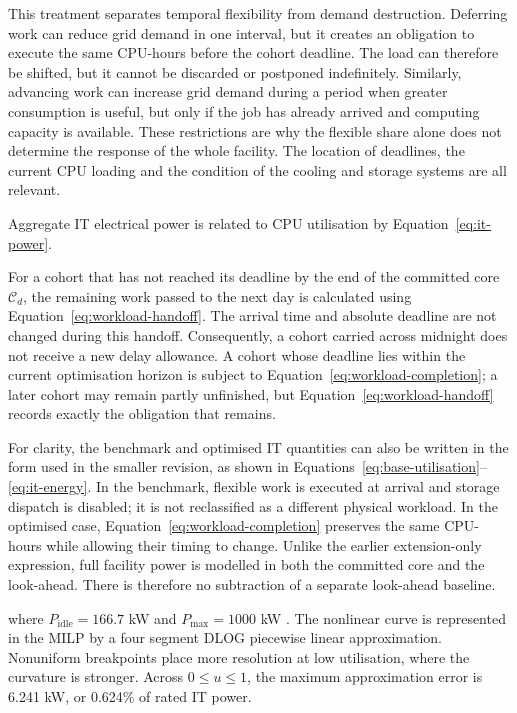 This treatment separates temporal flexibility from demand destruction.
Deferring work can reduce grid demand in one interval, but it creates an
obligation to execute the same CPU-hours before the cohort deadline. The load
can therefore be shifted, but it cannot be discarded or postponed indefinitely.
Similarly, advancing work can increase
grid demand during a period when greater consumption is useful, but only if the
job has already arrived and computing capacity is available. These restrictions
are why the flexible share alone does not determine the response of the whole
facility. The location of deadlines, the current CPU loading and the condition
of the cooling and storage systems are all relevant.

Aggregate IT electrical power is related to CPU utilisation by
Equation~\eqref{eq:it-power}.

For a cohort that has not reached its deadline by the end of the committed core
$\mathcal C_d$, the remaining work passed to the next day is calculated using
Equation~\eqref{eq:workload-handoff}.
The arrival time and absolute deadline are not changed during this handoff.
Consequently, a cohort carried across midnight does not receive a new delay
allowance. A cohort whose deadline lies within the current optimisation horizon
is subject to Equation~\eqref{eq:workload-completion}; a later cohort may remain
partly unfinished, but Equation~\eqref{eq:workload-handoff} records exactly the
obligation that remains.

For clarity, the benchmark and optimised IT quantities can also be written in
the form used in the smaller revision, as shown in
Equations~\eqref{eq:base-utilisation}--\eqref{eq:it-energy}.
In the benchmark, flexible work is executed at arrival and storage dispatch is
disabled; it is not reclassified as a different physical workload. In the
optimised case, Equation~\eqref{eq:workload-completion} preserves the same
CPU-hours while allowing their timing to change. Unlike the earlier
extension-only expression, full facility power is modelled in both the
committed core and the look-ahead. There is therefore no subtraction of a
separate look-ahead baseline.

where $P_{\mathrm{idle}}=166.7$ kW and $P_{\max}=1000$ kW
\cite{dayarathna2015data,v2015analysis}. The nonlinear curve is represented in
the MILP by a four segment DLOG piecewise linear approximation. Nonuniform
breakpoints place more resolution at low utilisation, where the curvature is
stronger. Across $0\leq u\leq1$, the maximum approximation error is 6.241 kW,
or 0.624\% of rated IT power.

